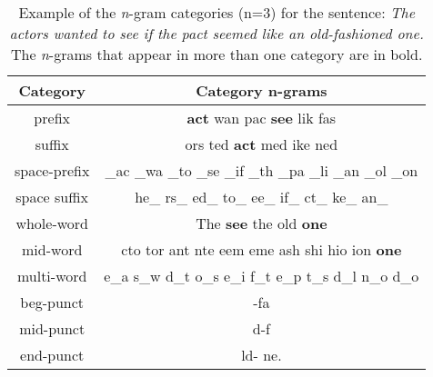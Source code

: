 \begin{table}[h!]
	\begin{center}  
		\caption[Example of the \textit{n}-gram categories (n=3)]{Example of the \textit{n}-gram categories (n=3) for the sentence: \textit{The actors wanted to see if the pact seemed like an old-fashioned one.} \\ 
			The \textit{n}-grams that appear in more than one category are in bold.} 
		\label{tab:examplesngram}
		\begin{tabular}{|c | c |}
			\hline 
			\textbf{Category} & \textbf{Category n-grams} \\
			\hline \hline
			prefix & \textbf{act} wan pac \textbf{see} lik fas \\ \hline
			suffix & ors ted \textbf{act} med ike ned \\ \hline
			space-prefix & \_ac \_wa \_to \_se \_if \_th \_pa \_li \_an \_ol \_on \\ \hline
			space suffix & he\_ rs\_ ed\_ to\_ ee\_ if\_ ct\_ ke\_ an\_ \\ \hline
			whole-word & The \textbf{see} the old \textbf{one} \\ \hline
			mid-word & cto tor ant nte eem eme ash shi hio ion \textbf{one} \\ \hline
			multi-word & e\_a s\_w d\_t o\_s e\_i f\_t e\_p t\_s d\_l n\_o d\_o \\ \hline
			beg-punct & -fa \\ \hline
			mid-punct & d-f \\ \hline
			end-punct & ld- ne. \\ \hline
		\end{tabular} 
	\end{center}
\end{table}


